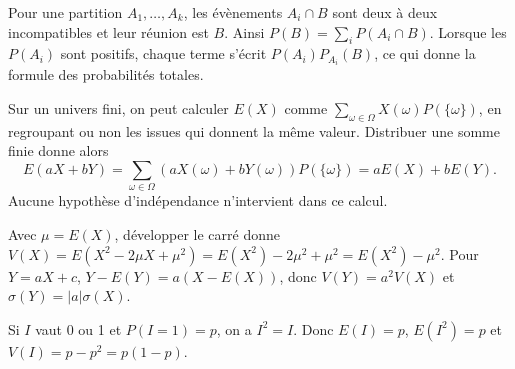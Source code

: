 \clearpage
{}
\label{dem-probabilites}
\begin{demonstration}
Pour une partition $A_1,\ldots,A_k$, les évènements $A_i\cap B$ sont deux à deux
incompatibles et leur réunion est $B$. Ainsi $P(B)=\sum_i P(A_i\cap B)$.
Lorsque les $P(A_i)$ sont positifs, chaque terme s'écrit $P(A_i)P_{A_i}(B)$,
ce qui donne la formule des probabilités totales.
\end{demonstration}
\begin{demonstration}
Sur un univers fini, on peut calculer $E(X)$ comme
$\sum_{\omega\in\Omega}X(\omega)P(\{\omega\})$, en regroupant ou non les issues
qui donnent la même valeur. Distribuer une somme finie donne alors
\[E(aX+bY)=\sum_{\omega\in\Omega}(aX(\omega)+bY(\omega))P(\{\omega\})
=aE(X)+bE(Y).\]
Aucune hypothèse d'indépendance n'intervient dans ce calcul.
\end{demonstration}
\begin{demonstration}
Avec $\mu=E(X)$, développer le carré donne
$V(X)=E(X^2-2\mu X+\mu^2)=E(X^2)-2\mu^2+\mu^2=E(X^2)-\mu^2$.
Pour $Y=aX+c$, $Y-E(Y)=a(X-E(X))$, donc
$V(Y)=a^2V(X)$ et $\sigma(Y)=|a|\sigma(X)$.
\end{demonstration}
\begin{exemple}
Si $I$ vaut 0 ou 1 et $P(I=1)=p$, on a $I^2=I$.
Donc $E(I)=p$, $E(I^2)=p$ et $V(I)=p-p^2=p(1-p)$.
\end{exemple}
\clearpage
\pagestyle{otMain}
